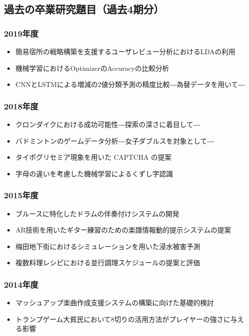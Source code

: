 \documentclass[uplatex,jis2004,a4paper,11pt]{jsarticle}
\begin{document}
\subsection*{過去の卒業研究題目（過去4期分）}
\vspace{-.5cm}
\begin{multicols}{2}
{\small
\subsubsection*{2019年度}
\begin{itemize}
  \item 簡易宿所の戦略構築を支援するユーザレビュー分析におけるLDAの利用
  \item 機械学習におけるOptimizerのAccuracyの比較分析
  \item CNNとLSTMによる増減の2値分類予測の精度比較―為替データを用いて― 
\end{itemize}
\subsubsection*{2018年度}
\begin{itemize}
  \item クロンダイクにおける成功可能性―探索の深さに着目して―
  \item バドミントンのゲームデータ分析―女子ダブルスを対象として―
  \item タイポグリセミア現象を用いた CAPTCHA の提案
  \item 字母の違いを考慮した機械学習によるくずし字認識
\end{itemize}
\subsubsection*{2015年度}
\begin{itemize}
  \item ブルースに特化したドラムの伴奏付けシステムの開発
  \item AR技術を用いたギター練習のための楽譜情報動的提示システムの提案
  \item 梅田地下街におけるシミュレーションを用いた浸水被害予測
  \item 複数料理レシピにおける並行調理スケジュールの提案と評価
\end{itemize}
\subsubsection*{2014年度}
\begin{itemize}
  \item マッシュアップ楽曲作成支援システムの構築に向けた基礎的検討
  \item トランプゲーム大貧民において8切りの活用方法がプレイヤーの強さに与える影響
\end{itemize}
\vspace{-.4cm}
}
\end{multicols}
\end{document}
